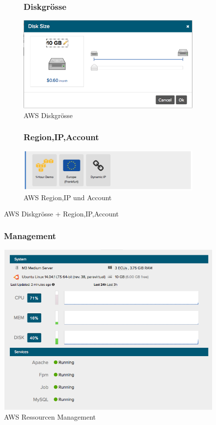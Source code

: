 \begin{figure}[!htbp]
  \centering
  \begin{subfigure}[b]{.49\textwidth}
\subsubsection{Diskgrösse}
\includegraphics[width=\textwidth]{./03_Analyse/03_Bitnami/images/aws_disk}
\caption{AWS Diskgrösse}
\end{subfigure}
  \hfill
\begin{subfigure}[b]{.49\textwidth}
\subsubsection{Region,IP,Account}
\includegraphics[width=\textwidth]{./03_Analyse/03_Bitnami/images/aws_random}
\caption{AWS Region,IP und Account}
\end{subfigure}
\caption{AWS Diskgrösse + Region,IP,Account}
\end{figure}

\newpage
 
\begin{figure}[!htbp]
   \centering
    \subsubsection{Management}
\includegraphics[width=.5\textwidth]{./03_Analyse/03_Bitnami/images/aws_resourcen}
\caption{AWS Ressourcen Management}
\end{figure}


